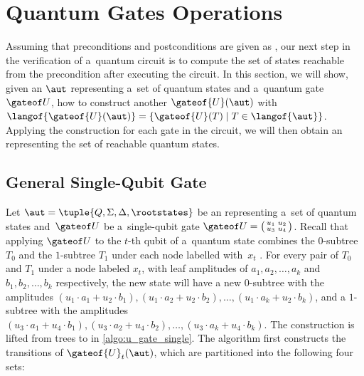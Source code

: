 \vspace{-0.0mm}
\section{Quantum Gates Operations}\label{sec:quantum_states_and_gates} 
\vspace{-0.0mm}
Assuming that preconditions and postconditions are given as \lstas, our next
step in the verification of a~quantum circuit is to compute the set of states reachable from the precondition after executing the  circuit.
In this section, we will show, given an \lsta $\aut$ representing a~set of
quantum states and a~quantum gate~$\gateof U$, how to construct another \lsta
$\gateof{U}(\aut)$
with $\langof{\gateof{U}(\aut)}=\{\gateof{U}(T) \mid T \in \langof{\aut}\}$. Applying the
construction for each gate in the circuit, we will then obtain an \lsta representing
the set of reachable quantum states.

\vspace{-0.0mm}
\subsection{General Single-Qubit Gate}\label{subsec:single_qubit_gate}
\vspace{-0.0mm}

Let $\aut = \tuple{Q, \Sigma,
\Delta, \rootstates}$ be an \lsta representing a~set of quantum states
and~$\gateof U$ be a~single-qubit gate $\gateof U = \big(\begin{smallmatrix}
         u_{1} & u_{2} \\
        u_{3} & u_{4}
        \end{smallmatrix}\big)$. 
Recall that applying $\gateof U$ to the $t$-th qubit of a~quantum state combines the
$0$-subtree $T_0$ and the $1$-subtree $T_1$ under each node labelled with~$x_t$ .
For every pair of $T_0$ and $T_1$ under a node labeled $x_t$, with leaf
amplitudes of $a_1, a_2, \ldots, a_k$ and $b_1, b_2, \ldots, b_k$ respectively,
the new state will have a new $0$-subtree with the amplitudes $(u_1 \cdot a_1 +
u_2 \cdot b_1), (u_1 \cdot a_2 + u_2 \cdot b_2), \ldots, (u_1 \cdot a_k + u_2
\cdot b_k)$, and a $1$-subtree with the amplitudes $(u_3 \cdot a_1 + u_4 \cdot
b_1), (u_3 \cdot a_2 + u_4 \cdot b_2), \ldots, (u_3 \cdot a_k + u_4 \cdot b_k)$. 
The construction is lifted from trees to \lstas in \cref{algo:u_gate_single}.
The algorithm first constructs the transitions of $\gateof{U}_t(\aut)$, which
are partitioned into the following four sets:


